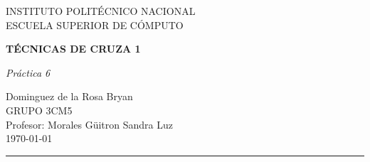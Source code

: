 \begin{titlepage}
\begin{center}
\begin{LARGE}
INSTITUTO POLITÉCNICO NACIONAL\\
\vspace*{0.15in}
ESCUELA SUPERIOR DE CÓMPUTO\\
\end{LARGE}
\vspace*{1.0in}
\begin{Large}
\textbf{TÉCNICAS DE CRUZA 1} \\  
\end{Large}
\vspace*{0.2in}
\begin{large}
\textit{Práctica 6}\\
\end{large}
\vspace*{1.0in}
\begin{large}
Dominguez de la Rosa Bryan\\
\vspace*{2.0in}
GRUPO 3CM5\\
\vspace*{0.2in}
Profesor: Morales Güitron Sandra Luz\\
\vspace*{1.5in}
\today
\vspace*{0.3in}
\end{large}
\rule{150mm}{0.1mm}\\

\end{center}
\end{titlepage}
